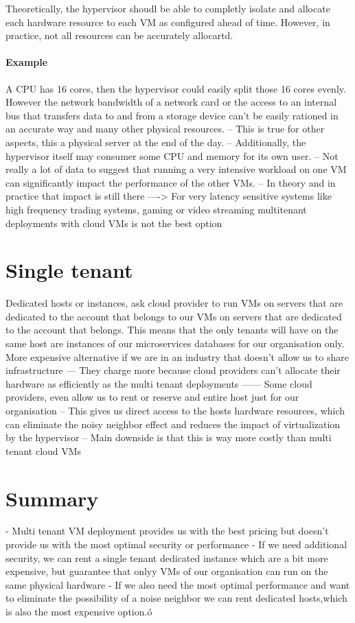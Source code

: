 \documentclass[a4paper, 11pt]{book}
\begin{document}
    Theoretically, the hypervisor shoudl be able to completly isolate and allocate each hardware resource to each VM as configured ahead of time.
    However, in practice, not all resources can be accurately allocartd.

    \paragraph{Example}
    A CPU has 16 cores, then the hypervisor could easily split those 16 cores evenly.
    However the network bandwidth of a network card or the access to an internal bus that transfers data to and from a storage device can't be easily rationed in an accurate way and many other physical resources.
    -- This is true for other aspects, this a physical server at the end of the day.
    -- Additionally, the hypervisor itself may consumer some CPU and memory for its own user.
    -- Not really a lot of data to suggest that running a very intensive workload on one VM can significantly impact the performance of the other VMs.
    -- In theory and in practice that impact is still there
    ----> For very latency sensitive systems like high frequency trading systems, gaming or video streaming multitenant deployments with cloud VMs is not the best option


    \section{Single tenant}
    Dedicated hosts or instances, ask cloud provider to run VMs on servers that are dedicated to the account that belongs to our VMs on servers that are dedicated to the account that belongs.
    This means that the only tenants will have on the same host are instances of our microservices databases for our organisation only.
    More expensive alternative if we are in an industry that doesn't allow us to share infrastructure
    --- They charge more because cloud providers can't allocate their hardware as efficiently as the multi tenant deployments
    ------ Some cloud providers, even allow us to rent or reserve and entire host just for our organisation
    -- This gives us direct access to the hosts hardware resources, which can eliminate the noisy neighbor effect and reduces the impact of virtualization by the hypervisor
    -- Main downside is that this is way more costly than multi tenant cloud VMs


    \section{Summary}
    - Multi tenant VM deployment provides us with the best pricing but doesn't provide us with the most optimal security or performance
    - If we need additional security, we can rent a single tenant dedicated instance which are a bit more expensive, but guarantee that onlyy VMs of our organisation can run on the same physical hardware
    - If we also need the most optimal performance and want to eliminate the possibility of a noise neighbor we can rent dedicated hosts,which is also the most expensive option.ó
\end{document}
